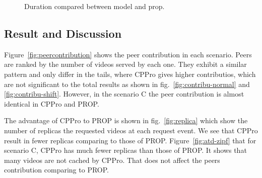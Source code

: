 \documentclass[10pt,final,journal,a4paper]{IEEEtran}
\begin{document}
\begin{figure}[!t]
\centering
{}
\hfill
{}
\hfill
{}
\vspace{2mm}
\caption{Duration compared between model and prop.}
\label{fig:duration}
\end{figure}



\subsection{Result and Discussion}\label{resultanddiscussion}

Figure~\ref{fig:peercontribution} shows the peer contribution in each scenario.
Peers are ranked by the number of videos served by each one.
They exhibit a similar pattern and only differ in the tails, where CPPro gives higher contributios, which are not significant to the total results as shown in fig.~\ref{fig:contribu-normal} and \ref{fig:contribu-shift}.
However, in the scenario C the peer contribution is almost identical in CPPro and PROP. 

The advantage of CPPro to PROP is shown in fig.~\ref{fig:replica} which show the number of replicas the requested videos at each request event.
We see that CPPro result in fewer replicas comparing to those of PROP.
Figure~\ref{fig:atd-zipf} that for scenario C,  CPPro has much fewer replicas than those of PROP.
It shows that many videos are not cached by CPPro.
That does not affect the peers contribution comparing to PROP.

\end{document}
